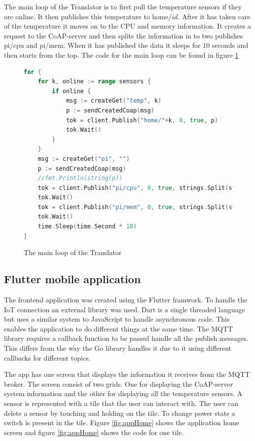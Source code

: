 The main loop of the Translator is to first pull the temperature sensors if they are online. It then publishes this temperature to home/$id$. After it has taken care of the temperature it moves on to the CPU and memory information. It creates a request to the CoAP-server and then splits the information in to two publishes pi/cpu and pi/mem. When it has published the data it sleeps for 10 seconds and then starts from the top. The code for the main loop can be found in figure \ref{code:translator:loop}

\begin{figure}[H]
    \begin{lstlisting}[language=go]
for {
    for k, online := range sensors {
        if online {
            msg := createGet("temp", k)
            p := sendCreatedCoap(msg)
            tok = client.Publish("home/"+k, 0, true, p)
            tok.Wait()
        }
    }
    msg := createGet("pi", "")
    p := sendCreatedCoap(msg)
    //fmt.Println(string(p))
    tok = client.Publish("pi/cpu", 0, true, strings.Split(string(p), ":")[0])
    tok.Wait()
    tok = client.Publish("pi/mem", 0, true, strings.Split(string(p), ":")[1])
    tok.Wait()
    time.Sleep(time.Second * 10)
}
\end{lstlisting}
    \caption{The main loop of the Translator}
    \label{code:translator:loop}
\end{figure}

\subsection{Flutter mobile application}
The frontend application was created using the Flutter framwork. To handle the IoT connection an external library \cite{dartMqtt} was used. Dart is a single threaded language but uses a similar system to JavaScript to handle asynchronous code. This enables the application to do different things at the same time. The MQTT library requires a callback function to be passed handle all the publish messages. This differs from the way the Go library handles it due to it using different callbacks for different topics. 

The app has one screen that displays the information it receives from the MQTT broker. The screen consist of two grids. One for displaying the CoAP-server system information and the other for displaying all the temperature sensors. A sensor is represented with a tile that the user can interact with. The user can delete a sensor by touching and holding on the tile. To change power state a switch is present in the tile. Figure \ref{fig:appHome} shows the application home screen and figure \ref{fig:appHome} shows the code for one tile.

